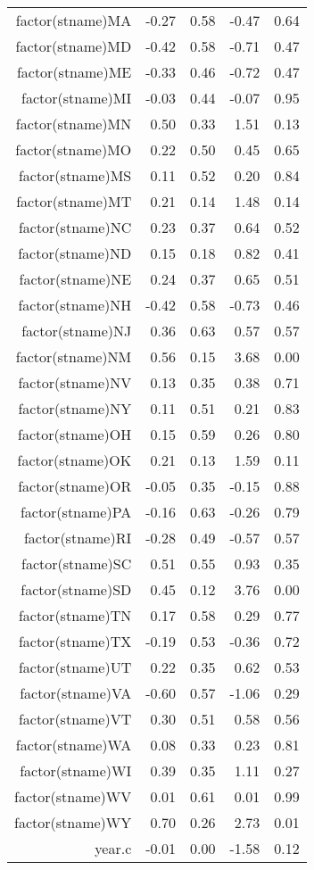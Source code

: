 \begin{table}[ht]
\begin{tabular}{rrrrr}
  factor(stname)MA & -0.27 & 0.58 & -0.47 & 0.64 \\ 
  factor(stname)MD & -0.42 & 0.58 & -0.71 & 0.47 \\ 
  factor(stname)ME & -0.33 & 0.46 & -0.72 & 0.47 \\ 
  factor(stname)MI & -0.03 & 0.44 & -0.07 & 0.95 \\ 
  factor(stname)MN & 0.50 & 0.33 & 1.51 & 0.13 \\ 
  factor(stname)MO & 0.22 & 0.50 & 0.45 & 0.65 \\ 
  factor(stname)MS & 0.11 & 0.52 & 0.20 & 0.84 \\ 
  factor(stname)MT & 0.21 & 0.14 & 1.48 & 0.14 \\ 
  factor(stname)NC & 0.23 & 0.37 & 0.64 & 0.52 \\ 
  factor(stname)ND & 0.15 & 0.18 & 0.82 & 0.41 \\ 
  factor(stname)NE & 0.24 & 0.37 & 0.65 & 0.51 \\ 
  factor(stname)NH & -0.42 & 0.58 & -0.73 & 0.46 \\ 
  factor(stname)NJ & 0.36 & 0.63 & 0.57 & 0.57 \\ 
  factor(stname)NM & 0.56 & 0.15 & 3.68 & 0.00 \\ 
  factor(stname)NV & 0.13 & 0.35 & 0.38 & 0.71 \\ 
  factor(stname)NY & 0.11 & 0.51 & 0.21 & 0.83 \\ 
  factor(stname)OH & 0.15 & 0.59 & 0.26 & 0.80 \\ 
  factor(stname)OK & 0.21 & 0.13 & 1.59 & 0.11 \\ 
  factor(stname)OR & -0.05 & 0.35 & -0.15 & 0.88 \\ 
  factor(stname)PA & -0.16 & 0.63 & -0.26 & 0.79 \\ 
  factor(stname)RI & -0.28 & 0.49 & -0.57 & 0.57 \\ 
  factor(stname)SC & 0.51 & 0.55 & 0.93 & 0.35 \\ 
  factor(stname)SD & 0.45 & 0.12 & 3.76 & 0.00 \\ 
  factor(stname)TN & 0.17 & 0.58 & 0.29 & 0.77 \\ 
  factor(stname)TX & -0.19 & 0.53 & -0.36 & 0.72 \\ 
  factor(stname)UT & 0.22 & 0.35 & 0.62 & 0.53 \\ 
  factor(stname)VA & -0.60 & 0.57 & -1.06 & 0.29 \\ 
  factor(stname)VT & 0.30 & 0.51 & 0.58 & 0.56 \\ 
  factor(stname)WA & 0.08 & 0.33 & 0.23 & 0.81 \\ 
  factor(stname)WI & 0.39 & 0.35 & 1.11 & 0.27 \\ 
  factor(stname)WV & 0.01 & 0.61 & 0.01 & 0.99 \\ 
  factor(stname)WY & 0.70 & 0.26 & 2.73 & 0.01 \\ 
  year.c & -0.01 & 0.00 & -1.58 & 0.12 \\ 
   \hline
\end{tabular}
\end{table}
